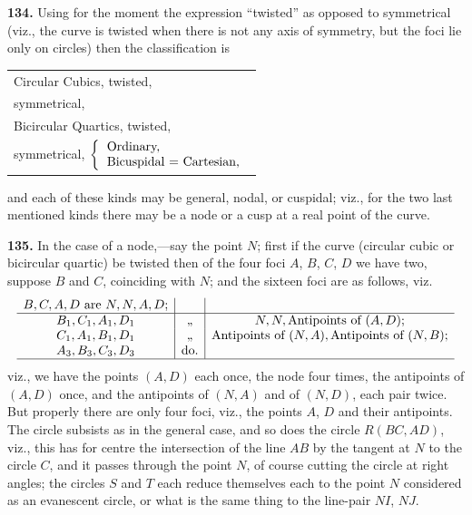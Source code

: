 \documentclass[12pt,a4paper]{article}
\theoremstyle{definition}
\begin{document}
\noindent\textbf{134.} Using for the moment the expression ``twisted'' as opposed to symmetrical
(viz., the curve is twisted when there is not any axis of symmetry, but the foci lie
only on circles) then the classification is
\begin{center}
\begin{tabular}{l}
Circular Cubics, twisted, \\
\quad\quad\quad symmetrical, \\
Bicircular Quartics, twisted, \\
\quad\quad\quad symmetrical, $\left\{\begin{tabular}{l} Ordinary, \\
Bicuspidal = Cartesian, \end{tabular}\right.$
\end{tabular}
\end{center}
and each of these kinds may be general, nodal, or cuspidal; viz., for the two last
mentioned kinds there may be a node or a cusp at a real point of the curve.

\newpage
\noindent\textbf{135.} In the case of a node,---say the point $N$; first if the curve (circular cubic
or bicircular quartic) be twisted then of the four foci $A$, $B$, $C$, $D$ we have two,
suppose $B$ and $C$, coinciding with $N$; and the sixteen foci are as follows, viz.
\[
\begin{array}{c|c|c}
B, C, A, D \text{ are } N, N, A, D; & & \\
\hline
B_1, C_1, A_1, D_1 & \text{,,} & N, N, \text{Antipoints of }(A, D); \\
C_1, A_1, B_1, D_1 & \text{,,} & \text{Antipoints of }(N, A), \text{Antipoints of }(N, B); \\
A_3, B_3, C_3, D_3 & \text{do.} & \\
\hline
\end{array}
\]
viz., we have the points $(A, D)$ each once, the node four times, the antipoints of
$(A, D)$ once, and the antipoints of $(N, A)$ and of $(N, D)$, each pair twice. But
properly there are only four foci, viz., the points $A$, $D$ and their antipoints. The
circle subsists as in the general case, and so does the circle $R(BC, AD)$, viz., this
has for centre the intersection of the line $AB$ by the tangent at $N$ to the circle $C$,
and it passes through the point $N$, of course cutting the circle at right angles;
the circles $S$ and $T$ each reduce themselves each to the point $N$ considered as an
evanescent circle, or what is the same thing to the line-pair $NI$, $NJ$.
\end{document}
